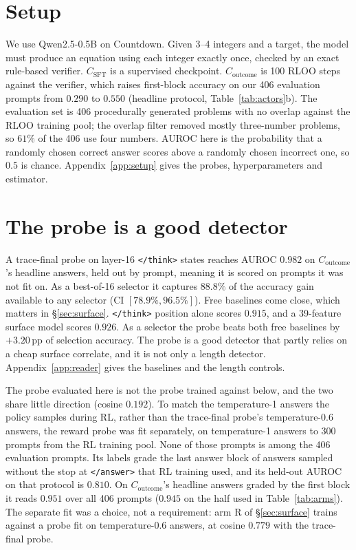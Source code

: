 \documentclass{article}
\begin{document}
\section{Setup}\label{sec:setup}

We use Qwen2.5-0.5B on Countdown. Given 3--4 integers and a target, the model must produce an equation using each integer exactly once, checked by an exact rule-based verifier. $C_{\text{SFT}}$ is a supervised checkpoint. $C_{\text{outcome}}$ is 100 RLOO steps against the verifier, which raises first-block accuracy on our 406 evaluation prompts from $0.290$ to $0.550$ (headline protocol, Table~\ref{tab:actors}b). The evaluation set is 406 procedurally generated problems with no overlap against the RLOO training pool; the overlap filter removed mostly three-number problems, so $61\%$ of the 406 use four numbers. AUROC here is the probability that a randomly chosen correct answer scores above a randomly chosen incorrect one, so $0.5$ is chance. Appendix~\ref{app:setup} gives the probes, hyperparameters and estimator.

\section{The probe is a good detector}\label{sec:probe-reader}

A trace-final probe on layer-16 \texttt{</think>} states reaches AUROC $0.982$ on $C_{\text{outcome}}$'s headline answers, held out by prompt, meaning it is scored on prompts it was not fit on. As a best-of-16 selector it captures $88.8\%$ of the accuracy gain available to any selector (CI $[78.9\%, 96.5\%]$). Free baselines come close, which matters in \S\ref{sec:surface}. \texttt{</think>} position alone scores $0.915$, and a 39-feature surface model scores $0.926$. As a selector the probe beats both free baselines by $+3.20$\,pp of selection accuracy. The probe is a good detector that partly relies on a cheap surface correlate, and it is not only a length detector. Appendix~\ref{app:reader} gives the baselines and the length controls.

The probe evaluated here is not the probe trained against below, and the two share little direction (cosine $0.192$). To match the temperature-1 answers the policy samples during RL, rather than the trace-final probe's temperature-0.6 answers, the reward probe was fit separately, on temperature-1 answers to 300 prompts from the RL training pool. None of those prompts is among the 406 evaluation prompts. Its labels grade the last answer block of answers sampled without the stop at \texttt{</answer>} that RL training used, and its held-out AUROC on that protocol is $0.810$. On $C_{\text{outcome}}$'s headline answers graded by the first block it reads $0.951$ over all 406 prompts ($0.945$ on the half used in Table~\ref{tab:arms}). The separate fit was a choice, not a requirement: arm R of \S\ref{sec:surface} trains against a probe fit on temperature-0.6 answers, at cosine $0.779$ with the trace-final probe.
\end{document}
